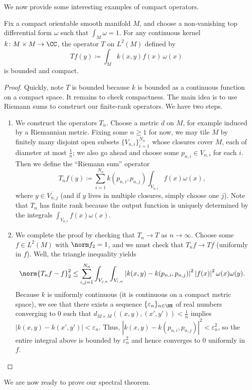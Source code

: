 \documentclass[notes.tex]{subfiles}
\begin{document}
We now provide some interesting examples of compact operators.
\begin{lemma} \label{lem:convolution-is-compact}
	Fix a compact orientable smooth manifold $M$, and choose a non-vanishing top differential form $\omega$ such that $\int_M\omega=1$. For any continuous kernel $k\colon M\times M\to\CC$, the operator $T$ on $L^2(M)$ defined by
	\[Tf(y)\coloneqq\int_Mk(x,y)f(x)\,\omega(x)\]
	is bounded and compact.
\end{lemma}
\begin{proof}
	Quickly, note $T$ is bounded because $k$ is bounded as a continuous function on a compact space. It remains to check compactness. The main idea is to use Riemann sums to construct our finite-rank operators.
	We have two steps.
	\begin{enumerate}
		\item We construct the operators $T_n$. Choose a metric $d$ on $M$, for example induced by a Riemannian metric. Fixing some $n\ge1$ for now, we may tile $M$ by finitely many disjoint open subsets $\{V_{n,i}\}_{i=1}^{N_n}$ whose closures cover $M$, each of diameter at most $\frac1n$; we also go ahead and choose some $p_{n,i}\in V_{n,i}$ for each $i$. Then we define the ``Riemann sum'' operator
		\[T_nf(y)\coloneqq\sum_{i=1}^{N_n}k(p_{n,i},p_{n,j})\int_{V_{n,i}}f(x)\omega(x),\]
		where $y\in\overline{V_{n,j}}$ (and if $y$ lives in multiple closures, simply choose one $j$). Note that $T_n$ has finite rank because the output function is uniquely determined by the integrals $\int_{V_{n,i}}f(x)\omega(x)$.
		\item We complete the proof by checking that $T_n\to T$ as $n\to\infty$. Choose some $f\in L^2(M)$ with $\norm f_2=1$, and we must check that $T_nf\to Tf$ (uniformly in $f$). Well, the triangle inequality yields
		\[\norm{T_nf-f}_2^2\le\sum_{i,j=1}^{N_n}\int_{V_{j,n}}\int_{V_{i,n}}\left|k(x,y)-k(p_{n,i},p_{n,j})\right|^2\left|f(x)\right|^2\omega(x)\omega(y).\]
		Because $k$ is uniformly continuous (it is continuous on a compact metric space), we see that there exists a sequence $\{\varepsilon_n\}_{n\in\NN}$ of real numbers converging to $0$ such that $d_{M\times M}((x,y),(x',y'))<\frac1n$ implies $\left|k(x,y)-k(x',y')\right|<\varepsilon_n$. Thus, $\left|k(x,y)-k(p_{n,i},p_{n,j})\right|^2<\varepsilon_n^2$, so the entire integral above is bounded by $\varepsilon_n^2$ and hence converges to $0$ uniformly in $f$.
		\qedhere
	\end{enumerate}
\end{proof}
We are now ready to prove our spectral theorem.
\end{document}

